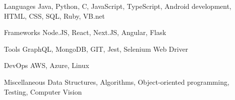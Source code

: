 


\begin{cvskills}

  \cvskill
    {Languages} %
    {Java, Python, C, JavaScript, TypeScript, Android development, HTML, CSS, SQL, Ruby, VB.net} %

  \cvskill
    {Frameworks} %
    {Node.JS, React, Next.JS, Angular, Flask} %

  \cvskill
    {Tools} %
    {GraphQL, MongoDB, GIT, Jest, Selenium Web Driver} %

  \cvskill
    {DevOps} %
    {AWS, Azure, Linux} %

  \cvskill
    {Miscellaneous} %
    {Data Structures, Algorithms, Object-oriented programming, Testing, Computer Vision} %

\end{cvskills}

